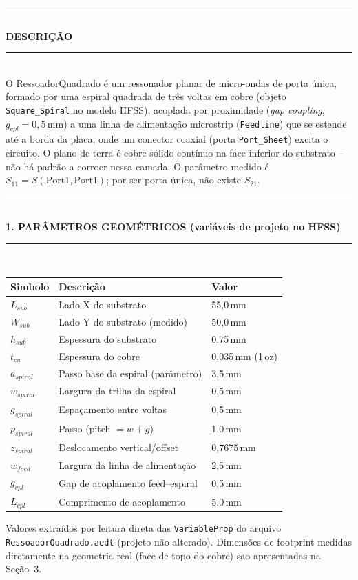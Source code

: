 \documentclass[10pt,a4paper]{article}
\newcommand{\legend}[1]{\par\vspace{2pt}\footnotesize\color{steel}#1}
\newenvironment{panel}[1]{%
  \par\noindent\textcolor{unbblue}{\rule{\textwidth}{1.1pt}}\\[1pt]
  {\bfseries\color{unbblue} #1}\\[2pt]
  \textcolor{unbblue}{\rule{\textwidth}{0.4pt}}\\[4pt]
}{%
  \par\vspace{2pt}
}
\begin{document}
\vspace{4pt}
\begin{panel}{DESCRI\c{C}\~AO}
O RessoadorQuadrado \'e um ressonador planar de micro-ondas de porta \'unica,
formado por uma espiral quadrada de tr\^es voltas em cobre (objeto
\texttt{Square\_Spiral} no modelo HFSS), acoplada por proximidade
(\emph{gap coupling}, $g_{cpl}=0{,}5$\,mm) a uma linha de alimenta\c{c}\~ao
microstrip (\texttt{Feedline}) que se estende at\'e a borda da placa,
onde um conector coaxial (porta \texttt{Port\_Sheet}) excita o circuito.
O plano de terra \'e cobre s\'olido cont\'inuo na face inferior do
substrato -- n\~ao h\'a padr\~ao a corroer nessa camada. O par\^ametro
medido \'e $S_{11}=S(\mathrm{Port1},\mathrm{Port1})$; por ser porta \'unica,
n\~ao existe $S_{21}$.
\end{panel}

\clearpage

\begin{panel}{1. PAR\^AMETROS GEOM\'ETRICOS (variáveis de projeto no HFSS)}
\begin{center}
\renewcommand{\arraystretch}{1.15}
\begin{tabular}{lll}
\toprule
\textbf{Simbolo} & \textbf{Descrição} & \textbf{Valor} \\
\midrule
$L_{sub}$   & Lado X do substrato               & 55,0\,mm \\
$W_{sub}$   & Lado Y do substrato (medido)       & 50,0\,mm \\
$h_{sub}$   & Espessura do substrato             & 0,75\,mm \\
$t_{cu}$    & Espessura do cobre                 & 0,035\,mm (1\,oz) \\
$a_{spiral}$& Passo base da espiral (parâmetro)  & 3,5\,mm \\
$w_{spiral}$& Largura da trilha da espiral       & 0,5\,mm \\
$g_{spiral}$& Espaçamento entre voltas           & 0,5\,mm \\
$p_{spiral}$& Passo (pitch $=w+g$)               & 1,0\,mm \\
$z_{spiral}$& Deslocamento vertical/offset       & 0,7675\,mm \\
$w_{feed}$  & Largura da linha de alimentação    & 2,5\,mm \\
$g_{cpl}$   & Gap de acoplamento feed--espiral   & 0,5\,mm \\
$L_{cpl}$   & Comprimento de acoplamento         & 5,0\,mm \\
\bottomrule
\end{tabular}
\end{center}
\legend{Valores extraídos por leitura direta das \texttt{VariableProp} do
arquivo \texttt{RessoadorQuadrado.aedt} (projeto não alterado). Dimensões
de footprint medidas diretamente na geometria real (face de topo do
cobre) sao apresentadas na Se\c{c}\~ao~3.}
\end{panel}
\end{document}
